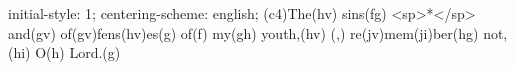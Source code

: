 initial-style: 1;
centering-scheme: english;
(c4)The(hv) sins(fg) <sp>*</sp> and(gv) of(gv)fens(hv)es(g) of(f) my(gh) youth,(hv) (,) re(jv)mem(ji)ber(hg) not,(hi) O(h) Lord.(g)
